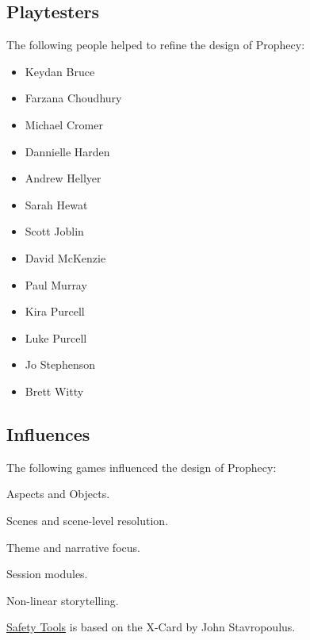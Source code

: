 \documentclass[12pt, a5paper, parskip=half-, footheight=1.4cm]{scrartcl}
\begin{document}
\subsection*{Playtesters} \label{subsection:playtesters}
The following people helped to refine the design of Prophecy:\vspace{-1.75ex}
\begin{multicols}{2}
\begin{itemize}[noitemsep,nolistsep,  leftmargin=0.68cm,topsep=-1ex]%
  \item Keydan Bruce
  \item Farzana Choudhury
  \item Michael Cromer
  \item Dannielle Harden
  \item Andrew Hellyer
  \item Sarah Hewat
  \item Scott Joblin
  \item David McKenzie
  \item Paul Murray
  \item Kira Purcell
  \item Luke Purcell
  \item Jo Stephenson
  \item Brett Witty
\end{itemize}
\end{multicols}

\subsection*{Influences} \label{subsection:influences}
The following games influenced the design of Prophecy:
\begin{description}[labelindent=0.25cm, leftmargin=\widthof{\hspace{0.25cm}\textbullet\space}, font=\normalfont\textbullet\space, noitemsep, topsep=-1ex]
	\item[Fate:] Aspects and Objects.
	\item[Fiasco:] Scenes and scene-level resolution.
	\item[Our Last Best Hope:] Theme and narrative focus.
	\item[10 Candles:] Session modules.
	\item[Microscope:] Non-linear storytelling.
\end{description}
\vspace{1ex}
\hyperref[subsection:safety-tools]{\cinzel \small Safety Tools} is based on the X-Card by John Stavropoulus.
\end{document}
